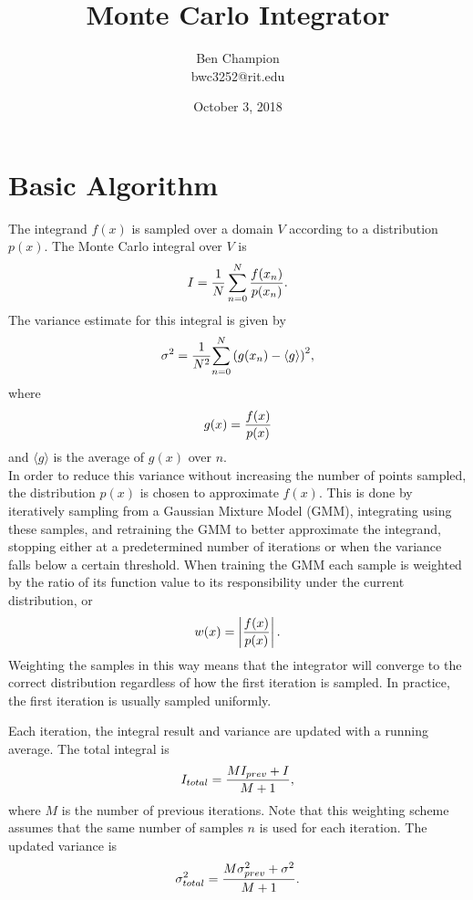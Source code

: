\documentclass{article}
\title{Monte Carlo Integrator}
\date{October 3, 2018}
\author{Ben Champion \\ bwc3252@rit.edu}
\begin{document}
\maketitle

\section{Basic Algorithm}

The integrand $f(x)$ is sampled over a domain $V$ according to a distribution
$p(x)$. The Monte Carlo integral over $V$ is
\begin{equation}
    I = {{1 \over N} \sum_{n=0}^{N} {f(x_n) \over {p(x_n)}}}.
\end{equation}
The variance estimate for this integral is given by
\begin{equation}
    \sigma^2 = {1 \over N^2}{\sum\limits_{n=0}^{N} {(g(x_n) - \langle g \rangle)}^2},
\end{equation}
where
\begin{equation}
    g(x) = {f(x) \over {p(x)}}
\end{equation}
and $\langle g \rangle$ is the average of $g(x)$ over $n$. \\

In order to reduce this variance without increasing the number of points
sampled, the distribution $p(x)$ is chosen to approximate $f(x)$. This is done
by iteratively sampling from a Gaussian Mixture Model (GMM), integrating using
these samples, and retraining the GMM to better approximate the integrand,
stopping either at a predetermined number of iterations or when the variance
falls below a certain threshold. When training the GMM each sample is weighted
by the ratio of its function value to its responsibility under the current
distribution, or
\begin{equation}
    w(x) = \left| {f(x) \over p(x)} \right|.
\end{equation}
Weighting the samples in this way means that the integrator will converge to
the correct distribution regardless of how the first iteration is sampled. In
practice, the first iteration is usually sampled uniformly.

Each iteration, the integral result and variance are updated with a running
average. The total integral is
\begin{equation}
    I_{total} = {{M I_{prev} + I} \over {M + 1}},
\end{equation}
where $M$ is the number of previous iterations. Note that this weighting scheme
assumes that the same number of samples $n$ is used for each iteration. The
updated variance is
\begin{equation}
    \sigma^2_{total} = {{M \sigma^2_{prev} + \sigma^2} \over {M + 1}}.
\end{equation}
\end{document}

